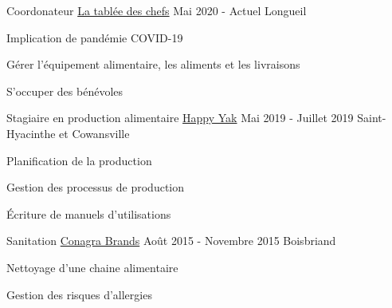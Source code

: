 

\begin{cventries}

  \cventry
    {Coordonateur} %
    {\href{https://www.tableedeschefs.org/en/}{La tablée des chefs}} %
    {Mai 2020 - Actuel} %
    {Longueil} %
    {
      \begin{cvitems} %
        \item {Implication de pandémie COVID-19}
        \item {Gérer l'équipement alimentaire, les aliments et les livraisons}
        \item {S'occuper des bénévoles}
      \end{cvitems}
    }

  \cventry
    {Stagiaire en production alimentaire} %
    {\href{https://happyyak.ca/en/}{Happy Yak}} %
    {Mai 2019 - Juillet 2019} %
    {Saint-Hyacinthe et Cowansville} %
    {
      \begin{cvitems} %
        \item {Planification de la production}
        \item {Gestion des processus de production}
        \item {Écriture de manuels d'utilisations}
      \end{cvitems}
    }

  \cventry
    {Sanitation} %
    {\href{http://www.conagrabrands.ca/en/brands}{Conagra Brands}} %
    {Août 2015 - Novembre 2015} %
    {Boisbriand} %
    {
      \begin{cvitems} %
        \item {Nettoyage d'une chaine alimentaire}
        \item {Gestion des risques d'allergies}
      \end{cvitems}
    }


\end{cventries}
